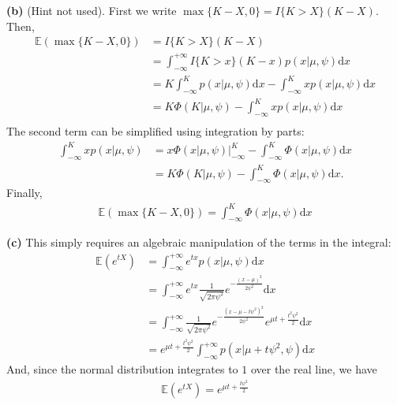 \documentclass[11pt]{article}
\renewcommand\part[1]{\vspace{.10in}\textbf{(#1)}}
\newcommand{\E}{\mathbb{E}}
\begin{document}
\part{b} (Hint not used). First we write $\max\{K - X, 0\} = I\{K > X\} (K - X)$. Then,
\begin{align}
    \E(\max\{K - X, 0\}) &= I\{K > X\} (K - X) \nonumber \\
                        &=\int_{-\infty}^{+\infty} I\{K > x\} (K - x) p(x\vert \mu, \psi) \mathrm{d}x\nonumber\\
                        &=K \int_{-\infty}^{K}p(x\vert \mu, \psi)\mathrm{d}x - \int_{-\infty}^{K} x p(x\vert \mu, \psi)\mathrm{d}x \nonumber\\
                        &=K \Phi (K\vert \mu, \psi) - \int_{-\infty}^{K} x p(x\vert \mu, \psi)\mathrm{d}x \nonumber\\
\end{align}
The second term can be simplified using integration by parts:
\begin{align}
    \int_{-\infty}^{K} x p(x\vert \mu, \psi) &= x \Phi(x\vert \mu, \psi)\bigg\rvert_{-\infty}^{K} - \int_{-\infty}^{K}\Phi(x\vert \mu, \psi)\mathrm{d}x\nonumber\\
                                             &= K \Phi(K\vert \mu, \psi) - \int_{-\infty}^{K}\Phi(x\vert \mu, \psi)\mathrm{d}x.
\end{align}
Finally,
\begin{align}
    \E(\max\{K - X, 0\}) = \int_{-\infty}^{K}\Phi(x\vert \mu, \psi)\mathrm{d}x
\end{align}

\part{c} This simply requires an algebraic manipulation of the terms in the integral:
\begin{align}
    \E(e^{tX}) &= \int_{-\infty}^{+\infty}e^{t x} p(x\vert \mu, \psi)\mathrm{d}x \nonumber\\
              &= \int_{-\infty}^{+\infty}e^{t x} \frac{1}{\sqrt{2\pi \psi^2}} e^{-\frac{(x - \mu)^2}{2\psi^2}}\mathrm{d}x \nonumber\\
              &= \int_{-\infty}^{+\infty}\frac{1}{\sqrt{2\pi \psi^2}} e^{-\frac{(x - \mu - t\psi^2)^2}{2\psi^2}}e^{\mu t + \frac{t^2 \psi^2}{2}}\mathrm{d}x \nonumber\\
              &= e^{\mu t + \frac{t^2 \psi^2}{2}} \int_{-\infty}^{+\infty} p(x\vert \mu + t\psi^2, \psi)\mathrm{d}x
\end{align}
And, since the normal distribution integrates to $1$ over the real line, we have
\begin{align}
    \E(e^{tX}) = e^{\mu t + \frac{t \psi^2}{2}}
\end{align}
\end{document}
